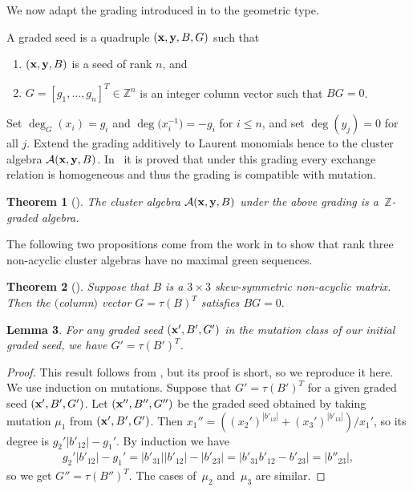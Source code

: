 \documentclass[pdftex]{sigma}
\numberwithin{equation}{section}
\newtheorem{Theorem}{Theorem}[section]
\newtheorem{Lemma}[Theorem]{Lemma}
\begin{document}
We now adapt the grading introduced in \cite[Def\/inition 3.1]{G} to the geometric type.
\begin{Definition}
A graded seed is a quadruple $({\bf x},{\bf y},B,G)$ such that
\begin{enumerate}\itemsep=0pt
\item[(i)] $({\bf x},{\bf y},B)$ is a seed of rank $n$, and
\item[(ii)] $G=[g_1,\dots,g_n]^T\in \mathbb{Z}^n$ is an integer column vector such that $BG=0$.
\end{enumerate}
\end{Definition}

Set $\deg_G(x_i)=g_i$ and $\deg\big(x_i^{-1}\big)=-g_i$ for $i\le n$, and set $\deg(y_j)=0$ for all $j$. Extend the grading additively to Laurent monomials hence to the cluster algebra $\mathcal{A}({\bf x},{\bf y},B)$. In~\cite{G} it is proved that under this grading every exchange relation is homogeneous and thus the grading is compatible with mutation.

\begin{Theorem}[]
The cluster algebra $\mathcal{A}({\bf x},{\bf y},B)$ under the above grading is a~$\mathbb{Z}$-graded algebra.
\end{Theorem}

The following two propositions come from the work in \cite{S1} to show that rank three non-acyclic cluster algebras have no maximal green sequences.
\begin{Theorem}[]
Suppose that $B$ is a $3\times 3$ skew-symmetric non-acyclic matrix. Then the $($column$)$ vector $G=\tau(B)^T$ satisfies $BG=0.$
\end{Theorem}

\begin{Lemma}\label{lemma: grading}
For any graded seed $({\bf x}',B',G')$ in the mutation class of our initial graded seed, we have $G'= \tau(B')^T$.
\end{Lemma}

\begin{proof}
This result follows from \cite[Lemma~2.3]{S1}, but its proof is short, so we reproduce it here. We use induction on mutations. Suppose that $G'= \tau(B')^T$ for a given graded seed $({\bf x}',B',G')$. Let $({\bf x}'',B'',G'')$ be the graded seed obtained by taking mutation $\mu_1$ from $({\bf x}',B',G')$.  Then $x_1''=((x_2')^{|b'_{12}|}+(x_3')^{|b'_{13}|})/x_1'$, so its degree is $g_2' |b'_{12}|-g_1'$. By induction we have
\begin{gather*}
g_2' |b'_{12}|-g_1' =|b'_{31}| |b'_{12}|-|b'_{23}| = |b'_{31}b'_{12}-b'_{23}| =|b''_{23}|,
\end{gather*}
so we get $G''= \tau(B'')^T$. The cases of~$\mu_2$ and~$\mu_3$ are similar.
\end{proof}
\end{document}
